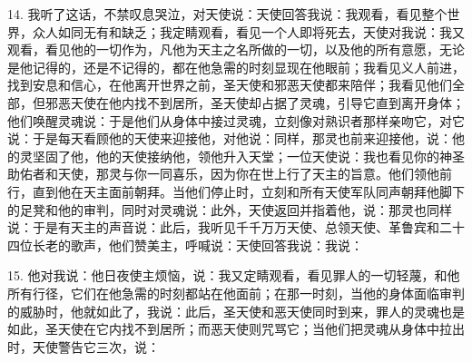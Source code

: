 14. 我听了这话，不禁叹息哭泣，对天使说：天使回答我说：我观看，看见整个世界，众人如同无有和缺乏；我定睛观看，看见一个人即将死去，天使对我说：我又观看，看见他的一切作为，凡他为天主之名所做的一切，以及他的所有意愿，无论是他记得的，还是不记得的，都在他急需的时刻显现在他眼前；我看见义人前进，找到安息和信心，在他离开世界之前，圣天使和邪恶天使都来陪伴；我看见他们全部，但邪恶天使在他内找不到居所，圣天使却占据了灵魂，引导它直到离开身体；他们唤醒灵魂说：于是他们从身体中接过灵魂，立刻像对熟识者那样亲吻它，对它说：于是每天看顾他的天使来迎接他，对他说：同样，那灵也前来迎接他，说：他的灵坚固了他，他的天使接纳他，领他升入天堂；一位天使说：我也看见你的神圣助佑者和天使，那灵与你一同喜乐，因为你在世上行了天主的旨意。他们领他前行，直到他在天主面前朝拜。当他们停止时，立刻和所有天使军队同声朝拜他脚下的足凳和他的审判，同时对灵魂说：此外，天使返回并指着他，说：那灵也同样说：于是有天主的声音说：此后，我听见千千万万天使、总领天使、革鲁宾和二十四位长老的歌声，他们赞美主，呼喊说：天使回答我说：我说：\par

15. 他对我说：他日夜使主烦恼，说：我又定睛观看，看见罪人的一切轻蔑，和他所有行径，它们在他急需的时刻都站在他面前；在那一时刻，当他的身体面临审判的威胁时，他就如此了，我说：此后，圣天使和恶天使同时到来，罪人的灵魂也是如此，圣天使在它内找不到居所；而恶天使则咒骂它；当他们把灵魂从身体中拉出时，天使警告它三次，说：\par

